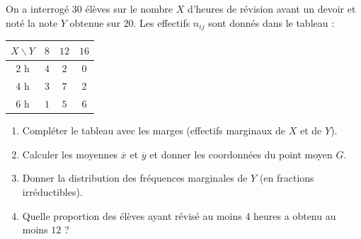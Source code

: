 
On a interrogé $30$ élèves sur le nombre $X$ d'heures de révision avant un devoir et noté la note $Y$ obtenue sur $20$. Les effectifs $n_{ij}$ sont donnés dans le tableau :

\begin{center}
\begin{tabular}{|c|c|c|c|}
\hline
$X\backslash Y$ & $8$ & $12$ & $16$ \\ \hline
$2$ h & $4$ & $2$ & $0$ \\ \hline
$4$ h & $3$ & $7$ & $2$ \\ \hline
$6$ h & $1$ & $5$ & $6$ \\ \hline
\end{tabular}
\end{center}

\begin{enumerate}
  \item Compléter le tableau avec les marges (effectifs marginaux de $X$ et de $Y$).
  \item Calculer les moyennes $\overline{x}$ et $\overline{y}$ et donner les coordonnées du point moyen $G$.
  \item Donner la distribution des fréquences marginales de $Y$ (en fractions irréductibles).
  \item Quelle proportion des élèves ayant révisé au moins $4$ heures a obtenu au moins $12$ ?
\end{enumerate}


